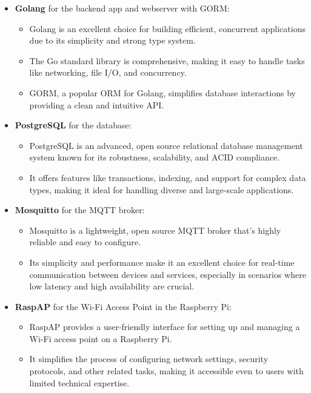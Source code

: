 \documentclass{report}
\begin{document}
        \begin{itemize}
            \item \textbf{Golang} for the backend app and webserver with GORM:
                \begin{itemize}
                \item Golang is an excellent choice for building efficient, concurrent applications due to its simplicity and strong type system.
                \item The Go standard library is comprehensive, making it easy to handle tasks like networking, file I/O, and concurrency.
                \item GORM, a popular ORM for Golang, simplifies database interactions by providing a clean and intuitive API.
                \end{itemize}

            \item \textbf{PostgreSQL} for the database:
                \begin{itemize}
                \item PostgreSQL is an advanced, open source relational database management system known for its robustness, scalability, and ACID compliance.
                \item It offers features like transactions, indexing, and support for complex data types, making it ideal for handling diverse and large-scale applications.
                \end{itemize}

            \item \textbf{Mosquitto} for the MQTT broker:
                \begin{itemize}
                \item Mosquitto is a lightweight, open source MQTT broker that's highly reliable and easy to configure.
                \item Its simplicity and performance make it an excellent choice for real-time communication between devices and services, especially in scenarios where low latency and high availability are crucial.
                \end{itemize}

            \item \textbf{RaspAP} for the Wi-Fi Access Point in the Raspberry Pi:
                \begin{itemize}
                \item RaspAP provides a user-friendly interface for setting up and managing a Wi-Fi access point on a Raspberry Pi.
                \item It simplifies the process of configuring network settings, security protocols, and other related tasks, making it accessible even to users with limited technical expertise.
                \end{itemize}


\end{itemize}
\end{document}
